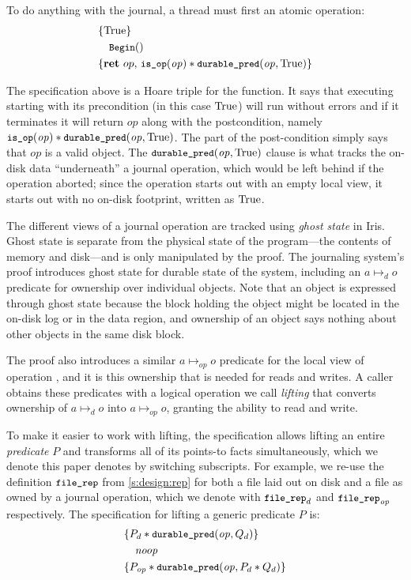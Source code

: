 To do anything with the journal, a thread must first  an atomic operation:
\hypertarget{tgt:begin-spec}{}
%
\begin{align*}
  \hoareV{\TRUE}{\cc{Begin}()}{\Ret{op}
    \cc{is_op}(\mathit{op}) \sep
    \bufobjDurable(\mathit{op}, \TRUE)}
\end{align*}

The specification above is a Hoare triple for the  function. It says
that executing  starting with its precondition (in this case $\mathrm{True}$) will run
without errors and if it terminates it will return $\mathit{op}$ along with the
postcondition, namely $\cc{is_op}(\mathit{op}) \sep \bufobjDurable(\mathit{op}, \TRUE)$.
The  part of the post-condition simply says that $\mathit{op}$ is a
valid  object. The $\bufobjDurable(\mathit{op}, \TRUE)$ clause is what tracks the
on-disk data ``underneath'' a journal operation, which would be left behind if the
operation aborted; since the operation starts out with an empty local view,
it starts out with no on-disk footprint, written as $\mathrm{True}$.


The different views of a journal operation are tracked using \emph{ghost state} in Iris.  Ghost state is separate from
the physical state of the program---the contents of memory and disk---and is
only manipulated by the proof. The journaling system's proof introduces ghost
state for durable state of the system, including an $a \mapsto_{d} o$ predicate
for ownership over individual objects. Note that an object is expressed through
ghost state because the block holding the object might be located in the on-disk
log or in the data region, and ownership of an object says nothing about other
objects in the same disk block.

The proof also introduces a similar $a \mapsto_{\mathit{op}} o$ predicate for the local
view of operation , and it is this ownership that is needed for reads and
writes. A caller obtains these predicates with a logical operation we call
\emph{lifting} that converts ownership of $a \mapsto_{d} o$ into $a \mapsto_{\mathit{op}} o$, granting the
ability to read and write.

To make it easier to work with lifting, the specification allows lifting an
entire \emph{predicate} $P$ and transforms all of its points-to facts
simultaneously, which we denote this paper denotes by switching subscripts. For
example, we re-use
the definition $\cc{file_rep}$ from \autoref{s:design:rep} for both a file laid
out on disk and a file as owned by a journal operation, which we denote with
$\cc{file_rep}_{d}$ and $\cc{file_rep}_{\mathit{op}}$ respectively. The specification
for lifting a generic predicate $P$ is:
%
\begin{align*}
  \hoareV{P_d \sep \bufobjDurable(\mathit{op}, Q_d)}{\SKIP}{P_{\mathit{op}} \sep \bufobjDurable(\mathit{op}, P_d \sep Q_d)}
\end{align*}


